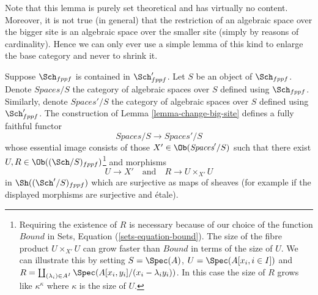 \noindent
Note that this lemma is purely set theoretical and has virtually no content.
Moreover, it is not true (in general) that the restriction of an algebraic
space over the bigger site is an algebraic space over the smaller site (simply
by reasons of cardinality). Hence we can only ever use a simple lemma of this
kind to enlarge the base category and never to shrink it.

\begin{lemma}
\label{lemma-fully-faithful}
Suppose $\Sch_{fppf}$ is contained in $\Sch'_{fppf}$.
Let $S$ be an object of $\Sch_{fppf}$. Denote
$\textit{Spaces}/S$ the category of algebraic spaces over $S$
defined using $\Sch_{fppf}$. Similarly, denote
$\textit{Spaces}'/S$ the category of algebraic spaces over $S$
defined using $\Sch'_{fppf}$. The construction of
Lemma \ref{lemma-change-big-site}
defines a fully faithful functor
$$
\textit{Spaces}/S \longrightarrow \textit{Spaces}'/S
$$
whose essential image consists of those $X' \in \Ob(\textit{Spaces}'/S)$
such that there exist $U, R \in \Ob((\Sch/S)_{fppf})$\footnote{Requiring the
existence of $R$ is necessary because of our choice of the function $Bound$ in
Sets, Equation (\ref{sets-equation-bound}). The size of the fibre product
$U \times_{X'} U$ can grow faster than $Bound$ in terms of the size of $U$. We
can illustrate this by setting $S = \Spec(A)$, $U = \Spec(A[x_i, i \in I])$ and
$R = \coprod_{(\lambda_i) \in A^I} \Spec(A[x_i, y_i]/(x_i - \lambda_i y_i))$.
In this case the size of $R$ grows like $\kappa^\kappa$ where $\kappa$ is the
size of $U$.} and morphisms
$$
U \longrightarrow X'
\quad\text{and}\quad
R \longrightarrow U \times_{X'} U
$$
in $\Sh((\Sch'/S)_{fppf})$ which are surjective as maps of sheaves
(for example if the displayed morphisms are surjective and \'etale).
\end{lemma}

